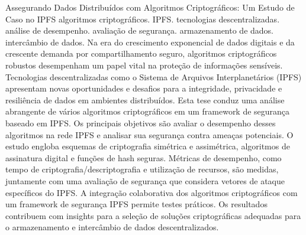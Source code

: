 \documentclass[cic,tc,english]{iiufrgs}
\begin{document}
\begin{abstract}
    In the era of exponential digital data growth and increasing demand for secure data sharing, robust cryptographic algorithms play a vital role in safeguarding sensitive information. Decentralized technologies like the InterPlanetary File System (IPFS) present new opportunities and challenges for data integrity, privacy, and resilience in distributed environments. This thesis conducts a comprehensive analysis of various cryptographic algorithms within an IPFS-based security framework. The primary objectives are to assess the performance of these algorithms in the IPFS network and evaluate their security against potential threats. The study encompasses symmetric and asymmetric encryption schemes, digital signature algorithms, and secure hashing functions. Performance metrics, including encryption/decryption time and resource utilization, are measured, alongside a security evaluation considering IPFS-specific attack vectors. Collaboratively integrating the cryptographic algorithms with an IPFS security framework allows practical testing. The findings contribute insights into selecting appropriate cryptographic solutions for decentralized data storage and exchange.
\end{abstract}

\begin{translatedabstract}
    { %
        Assegurando Dados Distribuídos com Algoritmos Criptográficos: Um Estudo de 
        Caso no IPFS
    }{ %
        algoritmos criptográficos. 
        IPFS. 
        tecnologias descentralizadas. 
        análise de desempenho. 
        avaliação de segurança. 
        armazenamento de dados. 
        intercâmbio de dados.
    }
    Na era do crescimento exponencial de dados digitais e da crescente demanda 
    por compartilhamento seguro, algoritmos criptográficos robustos desempenham 
    um papel vital na proteção de informações sensíveis. Tecnologias 
    descentralizadas como o Sistema de Arquivos Interplanetários (IPFS) 
    apresentam novas oportunidades e desafios para a integridade, privacidade 
    e resiliência de dados em ambientes distribuídos. Esta tese conduz uma 
    análise abrangente de vários algoritmos criptográficos em um framework de 
    segurança baseado em IPFS. Os principais objetivos são avaliar o desempenho 
    desses algoritmos na rede IPFS e analisar sua segurança contra ameaças 
    potenciais. O estudo engloba esquemas de criptografia simétrica e 
    assimétrica, algoritmos de assinatura digital e funções de hash seguras. 
    Métricas de desempenho, como tempo de criptografia/descriptografia e 
    utilização de recursos, são medidas, juntamente com uma avaliação de 
    segurança que considera vetores de ataque específicos do IPFS. A integração 
    colaborativa dos algoritmos criptográficos com um framework de segurança 
    IPFS permite testes práticos. Os resultados contribuem com insights para a 
    seleção de soluções criptográficas adequadas para o armazenamento e 
    intercâmbio de dados descentralizados.
\end{translatedabstract}
\end{document}

